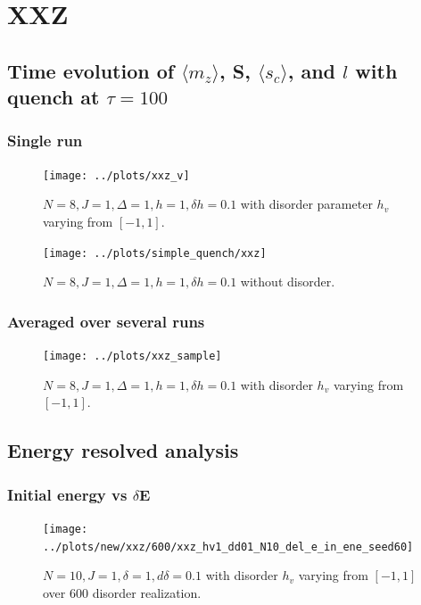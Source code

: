 \documentclass[a4paper]{article}
\begin{document}
\clearpage
\section{XXZ}
\subsection{Time evolution of $\langle m_z \rangle$, S, $\langle s_c \rangle$, and $l$ with quench at $\tau=100$}
\subsubsection{Single run}
\begin{figure}[h!]
  \centering
  \texttt{[image: ../plots/xxz\_v]}
  \caption{$N=8, J=1, \Delta=1, h=1, \delta h=0.1$ with disorder parameter $h_v$ varying from $[-1,1]$.}
\end{figure}

\begin{figure}[h!]
  \centering
  \texttt{[image: ../plots/simple\_quench/xxz]}
  \caption{$N = 8, J = 1, \Delta = 1, h = 1, \delta h = 0.1$ without disorder.}
\end{figure}

\newpage
\subsubsection{Averaged over several runs}
\begin{figure}[h!]
  \centering
  \texttt{[image: ../plots/xxz\_sample]}
  \caption{$N = 8, J = 1, \Delta = 1, h = 1, \delta h = 0.1$ with disorder $h_v$ varying from $[-1,1]$.}
  \label{fig:}
\end{figure}



\clearpage
\subsection{Energy resolved analysis}
\subsubsection{Initial energy vs $\delta$E}
\begin{figure}[h!]
  \centering
  \texttt{[image: ../plots/new/xxz/600/xxz\_hv1\_dd01\_N10\_del\_e\_in\_ene\_seed60]}
  \caption{$N = 10, J = 1, \delta = 1, d \delta =0.1$ with disorder $h_v$ varying from $[-1,1]$ over 600 disorder realization.}
  \label{fig:}
\end{figure}
\end{document}
